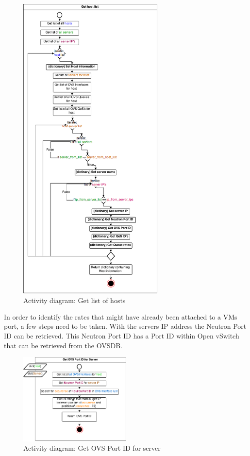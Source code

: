 \begin{figure}[H]
\centering

\includegraphics[width=0.65\textwidth]{images/design/activity_host_list}

\caption{Activity diagram: Get list of hosts}
\end{figure}

In order to identify the rates that might have already been attached to a VMs port, a few steps need to be taken. With the servers IP address the Neutron Port ID can be retrieved. This Neutron Port ID has a Port ID within Open vSwitch that can be retrieved from the OVSDB. 

\begin{figure}[H]
\centering

\includegraphics[width=0.5\textwidth]{images/design/activity_get_ovs_port_server}

\caption{Activity diagram: Get OVS Port ID for server}
\end{figure}

